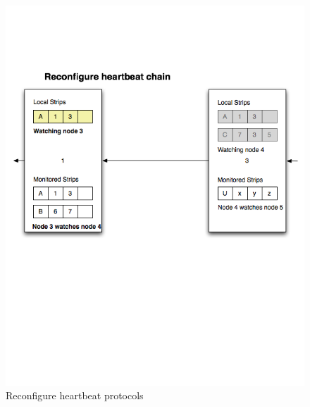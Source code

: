 \begin{figure}[h!]
\centering
    \includegraphics[width=\linewidth]{figures/strip9}
\caption{Reconfigure heartbeat protocols}
\label{fig:strip9}
\end{figure}

